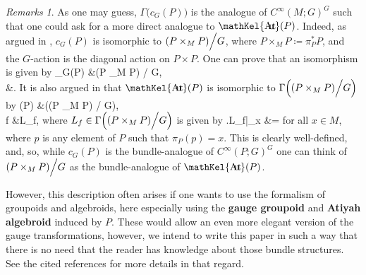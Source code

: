 \documentclass[a4paper,oneside,11pt,bibliography=totoc]{scrartcl}
\DeclareMathOperator{\sAut}{\mathKel{A\mkern-5.5mu u\mkern-4mu t\mkern-1.5mu}}
\def\bas#1\eas{\begin{align*}#1\end{align*}}
\theoremstyle{plain}
\theoremstyle{remark}
\newtheorem{remark}[theorem]{Remarks}
\theoremstyle{definition}
\begin{document}
\begin{remark}
\leavevmode\newline
As one may guess, $\Gamma\bigl( c_G(P) \bigr)$ is the analogue of $C^\infty(M; G)^G$ such that one could ask for a more direct analogue to $\sAut(P)$. Indeed, as argued in \cite[\S 1.3, Prop.\ 1.3.9, page 20]{mackenzieGeneralTheory}, $c_G(P)$ is isomorphic to $\mleft(P \times_M P\mright) \Big/ G$, where $P\times_M P \coloneqq \pi_P^*P$, and the $G$-action is the diagonal action on $P \times P$. One can prove that an isomorphism is given by 
\bas
c_G(P) &\to \mleft(P \times_M P\mright) \Big/ G,\\
[p, g] &\mapsto [p, p \cdot g].
\eas
It is also argued in \cite[\S 1.4, Ex.\ 1.4.7, page 25]{mackenzieGeneralTheory} that $\sAut(P)$ is isomorphic to $\Gamma\mleft(\mleft(P \times_M P\mright) \Big/ G\mright)$ by 
\bas
\sAut(P) &\to \Gamma\mleft(\mleft(P \times_M P\mright) \Big/ G\mright),\\
f &\mapsto L_f,
\eas
where $L_f \in \Gamma\mleft(\mleft(P \times_M P\mright) \Big/ G\mright)$ is given by
\bas
\mleft.L_f\mright|_x
&\coloneqq
[p, f(p)]
=
\eas
for all $x \in M$, where $p$ is any element of $P$ such that $\pi_P(p) = x$. This is clearly well-defined, and, so, while $c_G(P)$ is the bundle-analogue of $C^\infty(P; G)^G$ one can think of $\mleft(P \times_M P\mright) \Big/ G$ as the bundle-analogue of $\sAut(P)$.

However, this description often arises if one wants to use the formalism of groupoids and algebroids, here especially using the \textbf{gauge groupoid} and \textbf{Atiyah algebroid} induced by $P$. These would allow an even more elegant version of the gauge transformations, however, we intend to write this paper in such a way that there is no need that the reader has knowledge about those bundle structures. See the cited references for more details in that regard.
\end{remark}
\end{document}
